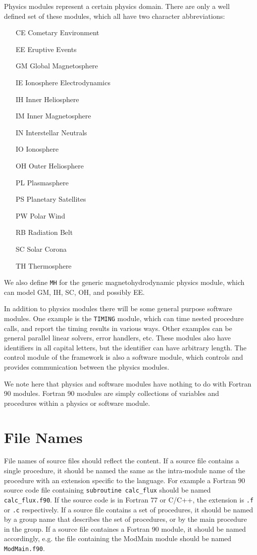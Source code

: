 Physics modules represent a certain physics domain. There are
only a well defined set of these modules, which all have two
character abbreviations:
\begin{itemize}
\item[CE]{Cometary Environment}
\item[EE]{Eruptive Events}
\item[GM]{Global Magnetosphere}
\item[IE]{Ionosphere Electrodynamics}
\item[IH]{Inner Heliosphere}
\item[IM]{Inner Magnetosphere}
\item[IN]{Interstellar Neutrals}
\item[IO]{Ionosphere}
\item[OH]{Outer Heliosphere}
\item[PL]{Plasmasphere}
\item[PS]{Planetary Satellites}
\item[PW]{Polar Wind}
\item[RB]{Radiation Belt}
\item[SC]{Solar Corona}
\item[TH]{Thermosphere}
\end{itemize}
We also define {\tt MH} for the generic magnetohydrodynamic
physics module, which can model GM, IH, SC, OH, and possibly EE.

In addition to physics modules there will be some general purpose
software modules. One example is the {\tt TIMING} module, which
can time nested procedure calls, and report the timing results
in various ways. Other examples can be general parallel linear
solvers, error handlers, etc. These modules also have identifiers
in all capital letters, but the identifier can have arbitrary
length. The control module of the framework is also a 
software module, which controls and provides communication
between the physics modules.

We note here that physics and software modules have nothing to do
with Fortran 90 modules. Fortran 90 modules are simply collections
of variables and procedures within a physics or software module.

\section{File Names}

File names of source files should reflect the content.
If a source file contains a single procedure, it
should be named the same as the intra-module name of
the procedure with an extension specific to the language.
For example a Fortran 90 source code file containing
{\tt subroutine calc\_flux} should be named
{\tt calc\_flux.f90}. If the source code is in Fortran 77 or C/C++,
the extension is {\tt .f} or {\tt .c} respectively.
If a source file contains a set of procedures,
it should be named by a group name that describes
the set of procedures, or by the main procedure in the group.
If a source file containes a Fortran 90 module, it should
be named accordingly, e.g. the file containing the ModMain module
should be named {\tt ModMain.f90}.

